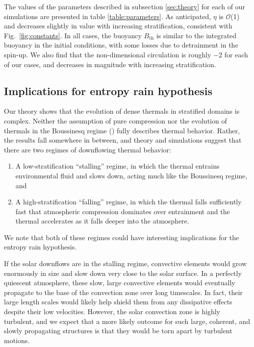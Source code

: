 The values of the parameters described in subsection \ref{sec:theory} for each of our simulations are presented in table \ref{table:parameters}.
As anticipated, $\eta$ is $\mathcal{O}$(1) and decreases slightly in value with increasing stratification, consistent with Fig.~\ref{fig:constants}.
In all cases, the buoyancy $B_{\text{th}}$ is similar to the integrated buoyancy in the initial conditions, with some losses due to detrainment in the spin-up.
We also find that the non-dimensional circulation is roughly $-2$ for each of our cases, and decreases in magnitude with increasing stratification.



\subsection{Implications for entropy rain hypothesis}
\label{sec:implications}
Our theory shows that the evolution of dense thermals in stratified domains is complex.
Neither the assumption of pure compression \cite[as in e.g.,][]{brandenburg2016} nor the evolution of thermals in the Boussinesq regime (\LJ) fully describes thermal behavior.
Rather, the results fall somewhere in between, and theory and simulations suggest that there are two regimes of downflowing thermal behavior:
\begin{enumerate}
\item A low-stratification ``stalling'' regime, in which the thermal entrains environmental fluid and slows down, acting much like the Boussinesq regime, and
\item A high-stratification ``falling'' regime, in which the thermal falls sufficiently fast that atmospheric compression dominates over entrainment and the thermal accelerates as it falls deeper into the atmosphere.
\end{enumerate}
We note that both of these regimes could have interesting implications for the entropy rain hypothesis.

If the solar downflows are in the stalling regime, convective elements would grow enormously in size and slow down very close to the solar surface.
In a perfectly quiescent atmosphere, these slow, large convective elements would eventually propagate to the base of the convection zone over long timescales.
In fact, their large length scales would likely help shield them from any dissipative effects despite their low velocities.
However, the solar convection zone is highly turbulent, and we expect that a more likely outcome for such large, coherent, and slowly propagating structures is that they would be torn apart by turbulent motions.

